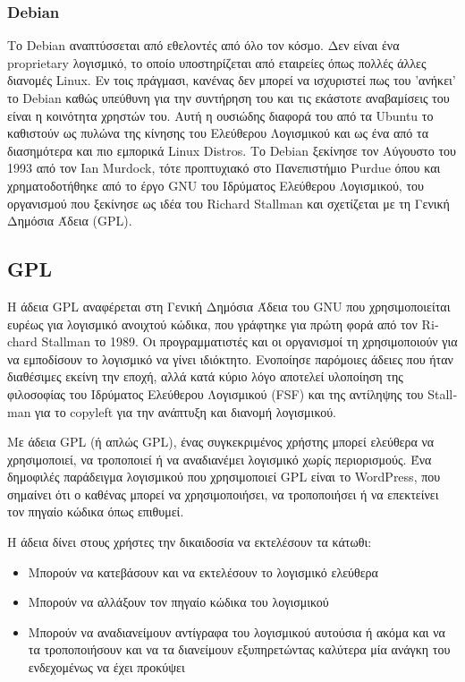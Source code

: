 \documentclass[a4paper, 11pt]{article}
\begin{document}
{\subsubsection{\textlatin{Debian}}
Το  \textlatin{Debian} αναπτύσσεται από εθελοντές από όλο τον κόσμο. Δεν είναι ένα  \textlatin{proprietary} λογισμικό, το οποίο υποστηρίζεται από εταιρείες όπως πολλές άλλες διανομές  \textlatin{Linux}. Εν τοις πράγμασι, κανένας δεν μπορεί να ισχυριστεί πως του 'ανήκει' το \textlatin{Debian} καθώς υπεύθυνη για την συντήρηση του και τις εκάστοτε αναβαμίσεις του είναι η κοινότητα χρηστών του. Αυτή η ουσιώδης διαφορά του από τα \textlatin{Ubuntu} το καθιστούν ως πυλώνα της κίνησης του Ελεύθερου Λογισμικού και ως ένα από τα διασημότερα και πιο εμπορικά \textlatin{Linux Distros}. Το \textlatin{Debian} ξεκίνησε τον Αύγουστο του 1993 από τον \textlatin{Ian Murdock}, τότε προπτυχιακό στο Πανεπιστήμιο \textlatin{Purdue} όπου και  χρηματοδοτήθηκε από το έργο \textlatin{GNU} του Ιδρύματος Ελεύθερου Λογισμικού, του οργανισμού που ξεκίνησε ως ιδέα του \textlatin{Richard Stallman} και σχετίζεται με τη Γενική Δημόσια Άδεια (\textlatin{GPL}).
\subsection{\textlatin{GPL}}
Η άδεια \textlatin{GPL} αναφέρεται στη Γενική Δημόσια Άδεια του \textlatin{GNU} που χρησιμοποιείται ευρέως για λογισμικό ανοιχτού κώδικα, που γράφτηκε για πρώτη φορά από τον \textlatin{Richard Stallman} το 1989. Οι προγραμματιστές και οι οργανισμοί τη χρησιμοποιούν για να εμποδίσουν το λογισμικό να γίνει ιδιόκτητο. Ενοποίησε παρόμοιες άδειες που ήταν διαθέσιμες εκείνη την εποχή, αλλά κατά κύριο λόγο αποτελεί υλοποίηση της φιλοσοφίας του Ιδρύματος Ελεύθερου Λογισμικού (\textlatin{FSF}) και της αντίληψης του \textlatin{Stallman} για το \textlatin{copyleft} για την ανάπτυξη και διανομή λογισμικού.

Με άδεια \textlatin{GPL} (ή απλώς \textlatin{GPL}), ένας συγκεκριμένος χρήστης μπορεί ελεύθερα να χρησιμοποιεί, να τροποποιεί ή να αναδιανέμει λογισμικό χωρίς περιορισμούς. Ένα δημοφιλές παράδειγμα λογισμικού που χρησιμοποιεί \textlatin{GPL} είναι το \textlatin{WordPress}, που σημαίνει ότι ο καθένας μπορεί να χρησιμοποιήσει, να τροποποιήσει ή να επεκτείνει τον πηγαίο κώδικα όπως επιθυμεί.

Η άδεια δίνει στους χρήστες την δικαιδοσία να εκτελέσουν τα κάτωθι:

\begin{itemize}
\item Μπορούν να κατεβάσουν και να εκτελέσουν το λογισμικό ελεύθερα
\item Μπορούν να αλλάξουν τον πηγαίο κώδικα του λογισμικού
\item Μπορούν να αναδιανείμουν αντίγραφα του λογισμικού αυτούσια ή ακόμα και να τα τροποποιήσουν και να τα διανείμουν εξυπηρετώντας καλύτερα μία ανάγκη του ενδεχομένως να έχει προκύψει
\end{itemize}

}
\end{document}
